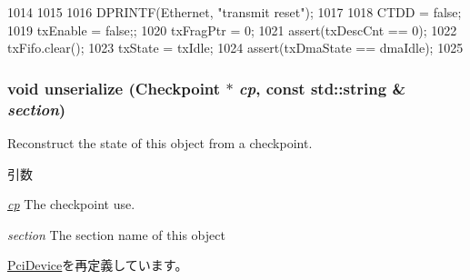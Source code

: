 \begin{DoxyCode}
1014 {
1015 
1016     DPRINTF(Ethernet, "transmit reset\n");
1017 
1018     CTDD = false;
1019     txEnable = false;;
1020     txFragPtr = 0;
1021     assert(txDescCnt == 0);
1022     txFifo.clear();
1023     txState = txIdle;
1024     assert(txDmaState == dmaIdle);
1025 }
\end{DoxyCode}
\hypertarget{classNSGigE_af22e5d6d660b97db37003ac61ac4ee49}{
\subsubsection[{unserialize}]{\setlength{\rightskip}{0pt plus 5cm}void unserialize ({\bf Checkpoint} $\ast$ {\em cp}, \/  const std::string \& {\em section})}}
\label{classNSGigE_af22e5d6d660b97db37003ac61ac4ee49}
Reconstruct the state of this object from a checkpoint. 
\begin{DoxyParams}{引数}
\item[{\em \hyperlink{namespacecp}{cp}}]The checkpoint use. \item[{\em section}]The section name of this object \end{DoxyParams}


\hyperlink{classPciDevice_af22e5d6d660b97db37003ac61ac4ee49}{PciDevice}を再定義しています。


